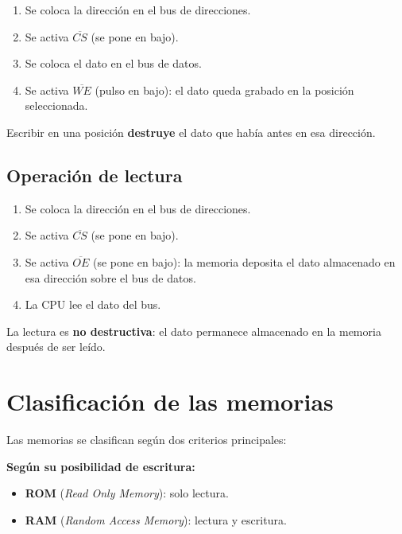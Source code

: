 \begin{enumerate}
  \item Se coloca la dirección en el bus de direcciones.
  \item Se activa $\overline{CS}$ (se pone en bajo).
  \item Se coloca el dato en el bus de datos.
  \item Se activa $\overline{WE}$ (pulso en bajo): el dato queda grabado en la posición seleccionada.
\end{enumerate}


\begin{advertenciabox}
Escribir en una posición \textbf{destruye} el dato que había antes en esa dirección.
\end{advertenciabox}

\subsection{Operación de lectura}

\begin{enumerate}
  \item Se coloca la dirección en el bus de direcciones.
  \item Se activa $\overline{CS}$ (se pone en bajo).
  \item Se activa $\overline{OE}$ (se pone en bajo): la memoria deposita el dato almacenado en esa dirección sobre el bus de datos.
  \item La CPU lee el dato del bus.
\end{enumerate}


\begin{notabox}
La lectura es \textbf{no destructiva}: el dato permanece almacenado en la memoria después de ser leído.
\end{notabox}

\section{Clasificación de las memorias}

Las memorias se clasifican según dos criterios principales:

\textbf{Según su posibilidad de escritura:}
\begin{itemize}
  \item \textbf{ROM} (\textit{Read Only Memory}): solo lectura.
  \item \textbf{RAM} (\textit{Random Access Memory}): lectura y escritura.
\end{itemize}

